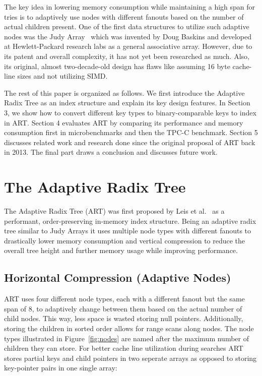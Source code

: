 \documentclass[acmtog, nonacm]{acmart}
\begin{document}
The key idea in lowering memory consumption while maintaining a high span for tries is to adaptively use nodes 
with different fanouts based on the number of actual children present. One of the first data structures to utilize such 
adaptive nodes was the Judy Array~\cite{baskins2004judy} which was invented by Doug Baskins and developed at 
Hewlett-Packard research labs as a general associative array. However, due to its patent and overall complexity, 
it has not yet been researched as much. Also, its original, almost two-decade-old design has flaws like assuming 
16 byte cache-line sizes and not utilizing SIMD.

The rest of this paper is organized as follows. We first introduce the Adaptive Radix Tree as an index structure 
and explain its key design features. In Section 3, we show how to convert different key types to binary-comparable keys to 
index in ART. Section 4 evaluates ART by comparing its performance and memory consumption first in 
microbenchmarks and then the TPC-C benchmark. Section 5 discusses related work and research done since the 
original proposal of ART back in 2013. The final part draws a conclusion and discusses future work.

\section{The Adaptive Radix Tree}

The Adaptive Radix Tree (ART) was first proposed by Leis et al.~\cite{6544812} as a performant, order-preserving 
in-memory index structure. Being an adaptive radix tree similar to Judy Arrays it uses multiple node types 
with different fanouts to drastically lower memory consumption and vertical compression to reduce the overall tree 
height and further memory usage while improving performance.

\subsection{Horizontal Compression (Adaptive Nodes)}
ART uses four different node types, each with a different fanout but the same span 
of 8, to adaptively change between them based on the actual number of child nodes. This way, less space is wasted 
storing null pointers. Additionally, storing the children in sorted order allows for range scans along nodes. The node types 
illustrated in Figure~\ref{fig:nodes} are named after the maximum number of children 
they can store. For better cache line utilization during searches ART stores partial keys and child pointers in two 
seperate arrays as opposed to storing key-pointer pairs in one single array:
\end{document}
